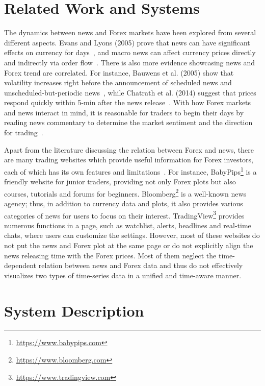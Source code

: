 \documentclass[sigconf]{acmart}
\begin{document}
\section{Related Work and Systems}\label{sec:related}
The dynamics between news and Forex markets have been explored from several different aspects.
Evans and Lyons (2005) prove that news can have significant effects on currency for days~\cite{EVANS2005197}, and macro news can affect currency prices directly and indirectly via order flow~\cite{EVANS200826}.
There is also more evidence showcasing news and Forex trend are correlated.
For instance, Bauwens et al.  (2005) show that volatility increases right before the announcement of scheduled news and unscheduled-but-periodic news~\cite{BAUWENS20051108}, while Chatrath et al. (2014) suggest that prices respond quickly within 5-min after the news release~\cite{CHATRATH201442}.
With how Forex markets and news interact in mind, it is reasonable for traders to begin their days by reading news commentary to determine the market sentiment and the direction for trading~\cite{samuels2015trader}.

Apart from the literature discussing the relation between Forex and news, there are many trading websites which provide useful information for Forex investors, each of which has its own features and limitations~\cite{ForexWebsites}.
For instance, BabyPips\footnote{\url{https://www.babypips.com}} is a friendly website for junior traders, providing not only Forex plots but also courses, tutorials and forums for beginners. Bloomberg\footnote{\url{https://www.bloomberg.com}} is a well-known news agency; thus, in addition to currency data and plots, it also provides various categories of news for users to focus on their interest.
TradingView\footnote{\url{https://www.tradingview.com}} provides numerous functions in a page, such as watchlist, alerts, headlines and real-time chats, where users can customize the settings. 
However, most of these websites do not put the news and Forex plot at the same page or do not explicitly align the news releasing time with the Forex prices.
Most of them neglect the time-dependent relation between news and Forex data and thus do not effectively visualizes two types of time-series data in a unified and time-aware manner. 


\section{System Description}\label{sec:system}
\end{document}
